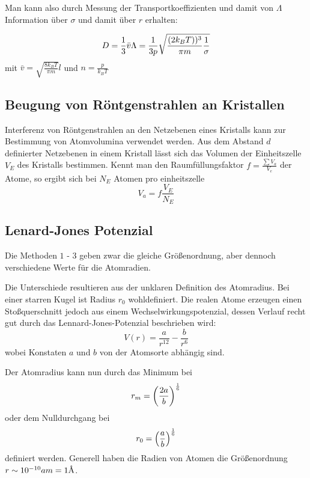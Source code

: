 Man kann also durch Messung der Transportkoeffizienten und damit von $\Lambda$
Information über $\sigma$ und damit über $r$ erhalten:
\begin{beis}
    \begin{equation*}
        D = \frac{1}{3} \bar{v} \Lambda 
        = \frac{1}{3p} \sqrt{\frac{\left( 2 k_B T \right))^3}{\pi m} \frac{1}{\sigma}}
    \end{equation*}
    mit $\bar{v} = \sqrt{\frac{8 k_B T}{\pi m}}l$ und $n= \frac{p}{k_B T}$
\end{beis}

\subsection{Beugung von Röntgenstrahlen an Kristallen} %
\label{sub:Beugung_von_Röntgenstrahlen_an_Kristallen}
Interferenz von Röntgenstrahlen an den Netzebenen eines Kristalls kann zur
Bestimmung von Atomvolumina verwendet werden. Aus dem Abstand $d$ definierter
Netzebenen in einem Kristall lässt sich das Volumen der Einheitszelle $V_E$ des
Kristalls bestimmen. Kennt man den Raumfüllungsfaktor $f = \frac{\sum
V_a}{V_e}$ der Atome, so ergibt sich bei $N_E$ Atomen pro einheitszelle 
\begin{equation*}
    \boxed{
        V_a = f \frac{V_E}{N_E}
    }
\end{equation*}
\subsection{Lenard-Jones Potenzial} %
\label{sub:Lenard-Jones_Potenzial}
Die Methoden $1$ - $3$ geben zwar die gleiche Größenordnung, aber dennoch
verschiedene Werte für die Atomradien.

Die Unterschiede resultieren aus der unklaren Definition des Atomradius. Bei
einer starren Kugel ist Radius $r_0$ wohldefiniert. Die realen Atome erzeugen
einen Stoßquerschnitt jedoch aus einem Wechselwirkungspotenzial, dessen Verlauf
recht gut durch das Lennard-Jones-Potenzial beschrieben wird:
\begin{equation*}
    V(r)= \frac{a}{r^{12}} - \frac{b}{r^6}
\end{equation*}
wobei Konstaten $a$ und $b$ von der Atomsorte abhängig sind.

Der Atomradius kann nun durch das Minimum bei
\begin{equation*}
    r_m = \left( \frac{2a}{b} \right)^{\frac{1}{6}}
\end{equation*}
oder dem Nulldurchgang bei
\begin{equation*}
    r_0 = \left( \frac{a}{b} \right)^{\frac{1}{6}}
\end{equation*}
definiert werden. Generell haben die Radien von Atomen die Größenordnung $r
\sim 10^{-10}a m = 1 \mbox{\normalfont\AA}$.

